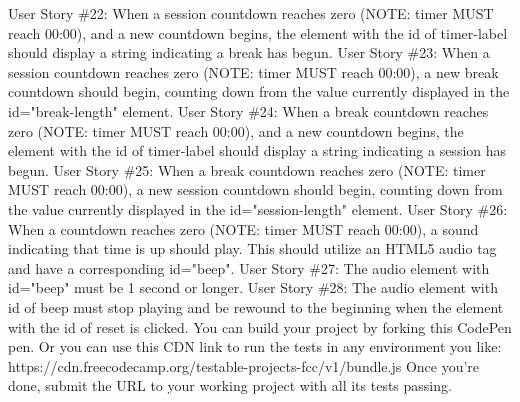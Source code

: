\documentclass{article}%
\begin{document}
User Story \#22: When a session countdown reaches zero (NOTE: timer MUST reach 00:00), and a new countdown begins, the element with the id of timer{-}label should display a string indicating a break has begun.\newline%
User Story \#23: When a session countdown reaches zero (NOTE: timer MUST reach 00:00), a new break countdown should begin, counting down from the value currently displayed in the id="break{-}length" element.\newline%
User Story \#24: When a break countdown reaches zero (NOTE: timer MUST reach 00:00), and a new countdown begins, the element with the id of timer{-}label should display a string indicating a session has begun.\newline%
User Story \#25: When a break countdown reaches zero (NOTE: timer MUST reach 00:00), a new session countdown should begin, counting down from the value currently displayed in the id="session{-}length" element.\newline%
User Story \#26: When a countdown reaches zero (NOTE: timer MUST reach 00:00), a sound indicating that time is up should play. This should utilize an HTML5 audio tag and have a corresponding id="beep".\newline%
User Story \#27: The audio element with id="beep" must be 1 second or longer.\newline%
User Story \#28: The audio element with id of beep must stop playing and be rewound to the beginning when the element with the id of reset is clicked.\newline%
You can build your project by forking this CodePen pen. Or you can use this CDN link to run the tests in any environment you like: https://cdn.freecodecamp.org/testable{-}projects{-}fcc/v1/bundle.js\newline%
Once you're done, submit the URL to your working project with all its tests passing.\newline%

%
\newpage%
\end{document}
